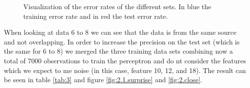 \documentclass[12pt]{article}
\begin{document}
\begin{figure}[b!]
	\hfill
	\caption[]{Visualization of the error rates of the different sets. In blue the training error rate and in red the test error rate. }
	\label{fig:2.1}
\end{figure}

\noindent

When looking at data 6 to 8 we can see that the data is from the same source and not overlapping. In order to increase the precision on the test set (which is the same for 6 to 8) we merged the three training data sets combining now a total of 7000 observations to train the perceptron and do nt consider the features which we expect to me noise (in this case, feature 10, 12, and 18). The result can be seen in table \ref{tab:3} and figure \ref{fig:2.1.surprise} and \ref{fig:2.close}.
\end{document}
